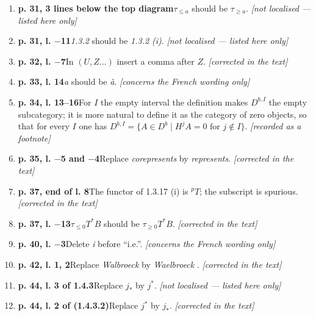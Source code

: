 \documentclass[12pt,oneside]{amsbook}
\theoremstyle{plain}
\theoremstyle{definition}
\begin{document}
\begin{enumerate}[label={\arabic*.},leftmargin=2.6em,itemsep=4pt]
\item \textbf{p. 31, 3 lines below the top diagram}\quad $\tau_{\leq a}$ should be $\tau_{\geq a}$. \hfill\newline \textsl{[not localised --- listed here only]}
\item \textbf{p. 31, l. $-$11}\quad \emph{1.3.2} should be \emph{1.3.2 (i)}. \hfill\newline \textsl{[not localised --- listed here only]}
\item \textbf{p. 32, l. $-$7}\quad In $(U,Z\dots)$ insert a comma after $Z$. \hfill\newline \textsl{[corrected in the text]}
\item \textbf{p. 33, l. 14}\quad \emph{a} should be \emph{à}. \hfill\newline \textsl{[concerns the French wording only]}
\item \textbf{p. 34, l. 13--16}\quad For $I$ the empty interval the definition makes $D^{b,I}$ the empty subcategory; it is more natural to define it as the category of zero objects, so that for every $I$ one has $D^{b,I}=\{A\in D^{b}\mid H^{j}A=0\text{ for }j\notin I\}$. \hfill\newline \textsl{[recorded as a footnote]}
\item \textbf{p. 35, l. $-$5 and $-$4}\quad Replace \emph{corepresents} by \emph{represents}. \hfill\newline \textsl{[corrected in the text]}
\item \textbf{p. 37, end of l. 8}\quad The functor of 1.3.17 (i) is ${}^{p}T$; the subscript is spurious. \hfill\newline \textsl{[corrected in the text]}
\item \textbf{p. 37, l. $-$13}\quad $\tau_{\leq0}T^{*}B$ should be $\tau_{\geq0}T^{*}B$. \hfill\newline \textsl{[corrected in the text]}
\item \textbf{p. 40, l. $-$3}\quad Delete \emph{i} before ``i.e.''. \hfill\newline \textsl{[concerns the French wording only]}
\item \textbf{p. 42, l. 1, 2}\quad Replace \emph{Walbroeck} by \emph{Waelbroeck} \cite{Wae72}. \hfill\newline \textsl{[corrected in the text]}
\item \textbf{p. 44, l. 3 of 1.4.3}\quad Replace $j_{*}$ by $j^{*}$. \hfill\newline \textsl{[not localised --- listed here only]}
\item \textbf{p. 44, l. 2 of (1.4.3.2)}\quad Replace $j^{*}$ by $j_{*}$. \hfill\newline \textsl{[corrected in the text]}

\end{enumerate}
\end{document}
